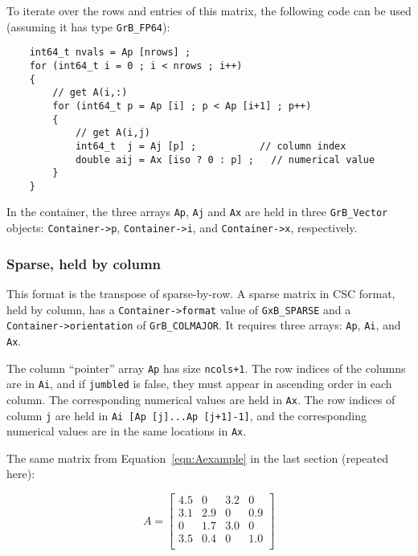 To iterate over the rows and entries of this matrix, the following code can be
used (assuming it has type \verb'GrB_FP64'):

    {\footnotesize
    \begin{verbatim}
    int64_t nvals = Ap [nrows] ;
    for (int64_t i = 0 ; i < nrows ; i++)
    {
        // get A(i,:)
        for (int64_t p = Ap [i] ; p < Ap [i+1] ; p++)
        {
            // get A(i,j)
            int64_t  j = Aj [p] ;           // column index
            double aij = Ax [iso ? 0 : p] ;   // numerical value
        }
    } \end{verbatim}}

In the container, the three arrays \verb'Ap', \verb'Aj' and \verb'Ax'
are held in three \verb'GrB_Vector' objects:
\verb'Container->p',
\verb'Container->i', and
\verb'Container->x', respectively.

\subsubsection{Sparse, held by column}
\label{format_sparse_by_col}

This format is the transpose of sparse-by-row.  A sparse matrix in CSC format,
held by column, has a \verb'Container->format' value of \verb'GxB_SPARSE' and a
\verb'Container->orientation' of \verb'GrB_COLMAJOR'.  It requires three
arrays: \verb'Ap', \verb'Ai', and \verb'Ax'.

The column ``pointer'' array \verb'Ap' has size \verb'ncols+1'.  The row
indices of the columns are in \verb'Ai', and if \verb'jumbled' is false,
they must appear in ascending order in
each column.  The corresponding numerical values are held in \verb'Ax'.  The
row indices of column \verb'j' are held in \verb'Ai [Ap [j]...Ap [j+1]-1]',
and the corresponding numerical values are in the same locations in \verb'Ax'.

The same matrix from Equation~\ref{eqn:Aexample} in
the last section (repeated here):

    \begin{equation}
    A = \left[
    \begin{array}{cccc}
    4.5 &   0 & 3.2 &   0 \\
    3.1 & 2.9 &  0  & 0.9 \\
     0  & 1.7 & 3.0 &   0 \\
    3.5 & 0.4 &  0  & 1.0 \\
    \end{array}
    \right]
    \end{equation}

